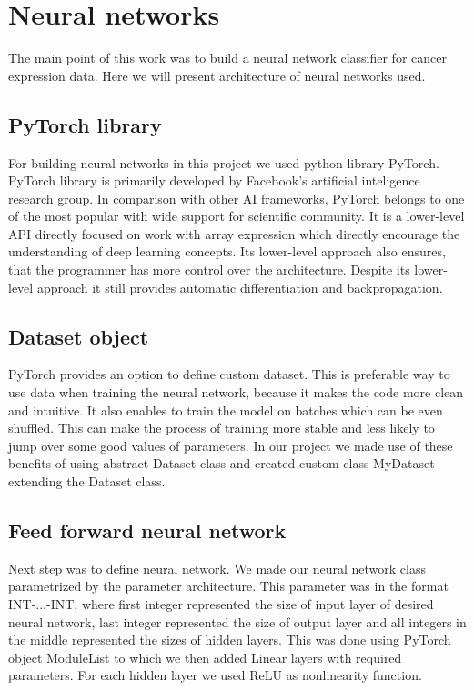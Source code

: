 \section{Neural networks}
The main point of this work was to build a neural network classifier for cancer expression data.
Here we will present architecture of neural networks used.

\subsection{PyTorch library}
For building neural networks in this project we used python library PyTorch.
PyTorch library is primarily developed by Facebook's artificial inteligence research group. \cite{pytorch}
In comparison with other AI frameworks, PyTorch belongs to one of the most popular with wide support for scientific community.
It is a lower-level API directly focused on work with array expression which directly encourage the understanding of deep learning concepts.
Its lower-level approach also ensures, that the programmer has more control over the architecture.
Despite its lower-level approach it still provides automatic differentiation and backpropagation.

\subsection{Dataset object}
PyTorch provides an option to define custom dataset.
This is preferable way to use data when training the neural network, because it makes the code more clean and intuitive.
It also enables to train the model on batches which can be even shuffled.
This can make the process of training more stable and less likely to jump over some good values of parameters.
In our project we made use of these benefits of using abstract Dataset class and created custom class MyDataset extending the Dataset class.

\subsection{Feed forward neural network}
Next step was to define neural network.
We made our neural network class parametrized by the parameter architecture.
This parameter was in the format INT-...-INT, where first integer represented the size of input layer of desired neural network, last integer represented the size of output layer and all integers in the middle represented the sizes of hidden layers.
This was done using PyTorch object ModuleList to which we then added Linear layers with required parameters.
For each hidden layer we used ReLU as nonlinearity function.

